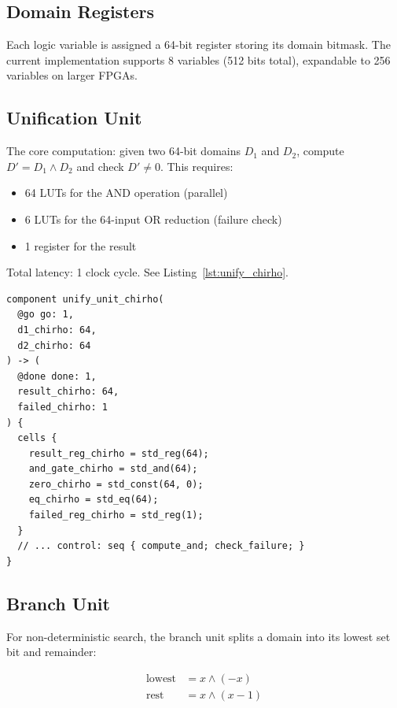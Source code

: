 \documentclass[11pt,a4paper]{article}
\begin{document}
\subsection{Domain Registers}
\label{subsec:domain_regs_chirho}

Each logic variable is assigned a 64-bit register storing its domain bitmask.
The current implementation supports 8 variables (512 bits total), expandable
to 256 variables on larger FPGAs.

\subsection{Unification Unit}
\label{subsec:unify_unit_chirho}

The core computation: given two 64-bit domains $D_1$ and $D_2$, compute
$D' = D_1 \land D_2$ and check $D' \neq 0$. This requires:

\begin{itemize}
  \item 64 LUTs for the AND operation (parallel)
  \item 6 LUTs for the 64-input OR reduction (failure check)
  \item 1 register for the result
\end{itemize}

Total latency: 1 clock cycle. See Listing~\ref{lst:unify_chirho}.

\begin{lstlisting}[style=calyxstyle_chirho, caption={Unification unit in Calyx IR (excerpt from \texttt{calyx\_chirho/domain\_chirho.futil})}, label={lst:unify_chirho}]
component unify_unit_chirho(
  @go go: 1,
  d1_chirho: 64,
  d2_chirho: 64
) -> (
  @done done: 1,
  result_chirho: 64,
  failed_chirho: 1
) {
  cells {
    result_reg_chirho = std_reg(64);
    and_gate_chirho = std_and(64);
    zero_chirho = std_const(64, 0);
    eq_chirho = std_eq(64);
    failed_reg_chirho = std_reg(1);
  }
  // ... control: seq { compute_and; check_failure; }
}
\end{lstlisting}

\subsection{Branch Unit}
\label{subsec:branch_unit_chirho}

For non-deterministic search, the branch unit splits a domain into its lowest
set bit and remainder:

\begin{align}
  \text{lowest} &= x \land (-x) \\
  \text{rest} &= x \land (x - 1)
\end{align}
\end{document}
